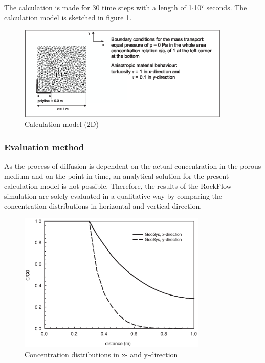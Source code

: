 The calculation is made for 30 time steps with a length of 1$\cdot$10$^7$ seconds. The calculation model is sketched in figure \ref{fig511}.

\begin{figure}[htbp]
\centering
\includegraphics[width=0.9\textwidth]{C/figures/fig511.eps}
\caption{Calculation model (2D)}
\label{fig511}
\end{figure}

\subsubsection*{Evaluation method}
As the process of diffusion is dependent on the actual concentration in the porous medium and on the point in time, an analytical solution for the present calculation model is not possible. Therefore, the results of the RockFlow simulation are solely evaluated in a qualitative way by comparing the concentration distributions in horizontal and vertical direction.

\begin{figure}[htbp]
\centering
\includegraphics[width=0.8\textwidth]{C/figures/fig512.EPS}
\caption{Concentration distributions in x- and y-direction}
\label{fig512}
\end{figure}


